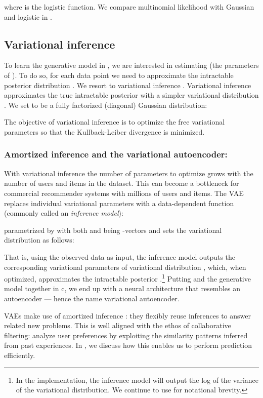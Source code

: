 \documentclass[sigconf]{acmart}
\begin{document}
where  is the logistic function. We compare multinomial likelihood with Gaussian and logistic in .


\subsection{Variational inference} \label{sec:vi}

To learn the generative model in , we are interested in estimating 
 (the parameters of ). To do so, for each data point we need to approximate the intractable posterior distribution .
We resort to variational inference \citep{jordan1999introduction}.
Variational inference approximates the true intractable posterior with a simpler variational distribution . 
We set  to be a fully factorized (diagonal) Gaussian distribution:

The objective of variational inference is to optimize the free variational parameters  so that the Kullback-Leiber divergence  is minimized.

\subsubsection{Amortized inference and the variational autoencoder:} 
With variational inference the number of parameters to optimize  grows with the 
number of users and items in the dataset. This can become a bottleneck for commercial 
recommender systems with millions of users and items. The \gls{VAE} \citep{kingma2013auto,rezende2014stochastic} replaces individual variational 
parameters with a data-dependent function (commonly called an \emph{inference model}):

parametrized by  with both  and  being -vectors and sets the variational distribution as follows:

That is, using the observed data  as input, the inference model outputs the corresponding 
variational parameters of variational distribution , which, when 
optimized, approximates the intractable posterior .\footnote{In the implementation, the inference 
model will output the log of the variance of the variational distribution. 
We continue to use  for notational brevity.} 
Putting  and the generative model  together in c, we end up 
with a neural architecture that resembles an autoencoder --- hence the name variational autoencoder. 

\Glspl{VAE} make use of amortized inference \citep{gershman2014amortized}: they flexibly reuse inferences
to answer related new problems. This is well aligned with the ethos of collaborative 
filtering: analyze user preferences by exploiting the similarity patterns inferred from 
past experiences. In , we discuss how this enables us to perform prediction efficiently. 
\end{document}

